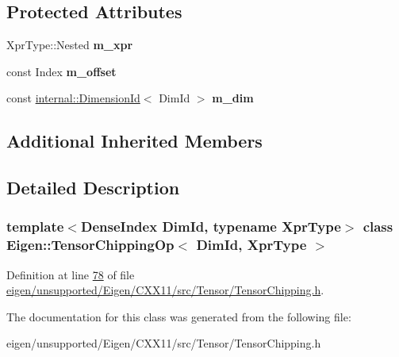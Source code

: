 \subsection*{Protected Attributes}
\begin{DoxyCompactItemize}
\item 
\mbox{\label{class_eigen_1_1_tensor_chipping_op_a30397b1d75dcc59e9b52787e25a33eec}} 
Xpr\+Type\+::\+Nested {\bfseries m\+\_\+xpr}
\item 
\mbox{\label{class_eigen_1_1_tensor_chipping_op_abb7d789c87ef3eb50ccdd7a11231f38e}} 
const Index {\bfseries m\+\_\+offset}
\item 
\mbox{\label{class_eigen_1_1_tensor_chipping_op_ad88f4a005f1e6546eb05cd6ee3dd6554}} 
const \hyperlink{struct_eigen_1_1internal_1_1_dimension_id}{internal\+::\+Dimension\+Id}$<$ Dim\+Id $>$ {\bfseries m\+\_\+dim}
\end{DoxyCompactItemize}
\subsection*{Additional Inherited Members}


\subsection{Detailed Description}
\subsubsection*{template$<$Dense\+Index Dim\+Id, typename Xpr\+Type$>$\newline
class Eigen\+::\+Tensor\+Chipping\+Op$<$ Dim\+Id, Xpr\+Type $>$}



Definition at line \hyperlink{eigen_2unsupported_2_eigen_2_c_x_x11_2src_2_tensor_2_tensor_chipping_8h_source_l00078}{78} of file \hyperlink{eigen_2unsupported_2_eigen_2_c_x_x11_2src_2_tensor_2_tensor_chipping_8h_source}{eigen/unsupported/\+Eigen/\+C\+X\+X11/src/\+Tensor/\+Tensor\+Chipping.\+h}.



The documentation for this class was generated from the following file\+:\begin{DoxyCompactItemize}
\item 
eigen/unsupported/\+Eigen/\+C\+X\+X11/src/\+Tensor/\+Tensor\+Chipping.\+h\end{DoxyCompactItemize}
